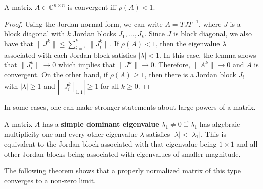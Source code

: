 \begin{theorem}
A matrix $A \in \mathbb{C}^{n\times n}$ is convergent iff $\rho(A)<1$.
\end{theorem}

\begin{proof}
Using the Jordan normal form, we can write $A = T J T^{-1}$, where $J$ is a block diagonal with $k$ Jordan blocks $J_1,\ldots,J_k$.
Since $J$ is block diagonal, we also have that $\| J^k \| \leq \sum_{i=1}^k \| J_i^k \|$.
If $\rho(A)<1$, then the eigenvalue $\lambda$ associated with each Jordan block satisfies $| \lambda | < 1$.
In this case, the lemma shows that $\| J_i^k \| \rightarrow 0$ which implies that $\| J^k \| \rightarrow 0$.
Therefore, $\| A^k \| \rightarrow 0$ and $A$ is convergent.
On the other hand, if $\rho(A) \geq 1$, then there is a Jordan block $J_i$ with $| \lambda | \geq 1$ and $| [ J_i^k ]_{1,1} | \geq 1$ for all $k\geq 0$.
\end{proof}

In some cases, one can make stronger statements about large powers of a matrix.

\begin{definition}
A matrix $A$ has a \textbf{simple dominant eigenvalue} $\lambda_1\ne0$ if $\lambda_1$ has algebraic multiplicity one and every other eigenvalue $\lambda$ satisfies $|\lambda|<|\lambda_1|$.
This is equivalent to the Jordan block associated with that eigenvalue being $1\times 1$ and all other Jordan blocks being associated with eigenvalues of smaller magnitude.
\end{definition}

The following theorem shows that a properly normalized matrix of this type converges to a non-zero limit.

